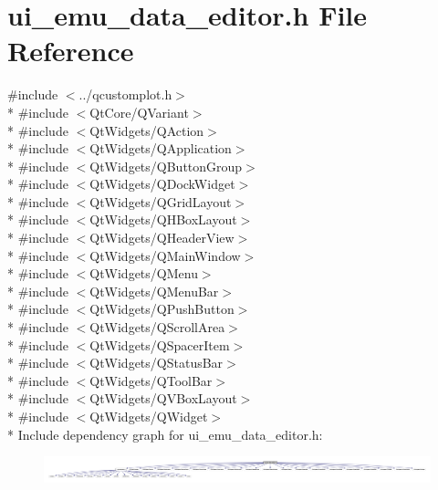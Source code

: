 \hypertarget{a00138}{\section{ui\+\_\+emu\+\_\+data\+\_\+editor.\+h File Reference}
\label{a00138}
}
{\ttfamily \#include $<$../qcustomplot.\+h$>$}\\*
{\ttfamily \#include $<$Qt\+Core/\+Q\+Variant$>$}\\*
{\ttfamily \#include $<$Qt\+Widgets/\+Q\+Action$>$}\\*
{\ttfamily \#include $<$Qt\+Widgets/\+Q\+Application$>$}\\*
{\ttfamily \#include $<$Qt\+Widgets/\+Q\+Button\+Group$>$}\\*
{\ttfamily \#include $<$Qt\+Widgets/\+Q\+Dock\+Widget$>$}\\*
{\ttfamily \#include $<$Qt\+Widgets/\+Q\+Grid\+Layout$>$}\\*
{\ttfamily \#include $<$Qt\+Widgets/\+Q\+H\+Box\+Layout$>$}\\*
{\ttfamily \#include $<$Qt\+Widgets/\+Q\+Header\+View$>$}\\*
{\ttfamily \#include $<$Qt\+Widgets/\+Q\+Main\+Window$>$}\\*
{\ttfamily \#include $<$Qt\+Widgets/\+Q\+Menu$>$}\\*
{\ttfamily \#include $<$Qt\+Widgets/\+Q\+Menu\+Bar$>$}\\*
{\ttfamily \#include $<$Qt\+Widgets/\+Q\+Push\+Button$>$}\\*
{\ttfamily \#include $<$Qt\+Widgets/\+Q\+Scroll\+Area$>$}\\*
{\ttfamily \#include $<$Qt\+Widgets/\+Q\+Spacer\+Item$>$}\\*
{\ttfamily \#include $<$Qt\+Widgets/\+Q\+Status\+Bar$>$}\\*
{\ttfamily \#include $<$Qt\+Widgets/\+Q\+Tool\+Bar$>$}\\*
{\ttfamily \#include $<$Qt\+Widgets/\+Q\+V\+Box\+Layout$>$}\\*
{\ttfamily \#include $<$Qt\+Widgets/\+Q\+Widget$>$}\\*
Include dependency graph for ui\+\_\+emu\+\_\+data\+\_\+editor.\+h\+:
\nopagebreak
\begin{figure}[H]
\begin{center}
\leavevmode
\includegraphics[width=350pt]{d8/de7/a00417}
\end{center}
\end{figure}
